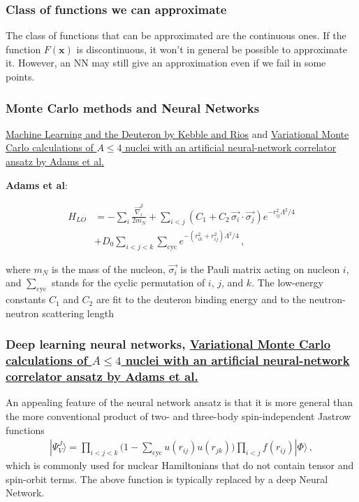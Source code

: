 \documentclass{beamer}
\begin{document}
\begin{frame}
\frametitle{Class of functions we can approximate}

\begin{block}{}
The class of functions that can be approximated are the continuous ones.
If the function $F(\bm{x})$ is discontinuous, it won't in general be possible to approximate it. However, an NN may still give an approximation even if we fail in some points.
\end{block}
\end{frame}

\begin{frame}
\frametitle{Monte Carlo methods and Neural Networks}

\href{{https://www.sciencedirect.com/science/article/pii/S0370269320305463?via%3Dihub}}{Machine Learning and the Deuteron by Kebble and Rios} and
\href{{https://journals.aps.org/prl/abstract/10.1103/PhysRevLett.127.022502}}{Variational Monte Carlo calculations of $A\le 4$ nuclei with an artificial neural-network correlator ansatz by Adams et al.}

\textbf{Adams et al}:

\begin{align}
H_{LO} &=-\sum_i \frac{{\vec{\nabla}_i^2}}{2m_N}
+\sum_{i<j} {\left(C_1  + C_2\, \vec{\sigma_i}\cdot\vec{\sigma_j}\right)
e^{-r_{ij}^2\Lambda^2 / 4 }}
\nonumber\\
&+D_0 \sum_{i<j<k} \sum_{\text{cyc}}
{e^{-\left(r_{ik}^2+r_{ij}^2\right)\Lambda^2/4}}\,,
\end{align}

where $m_N$ is the mass of the nucleon, $\vec{\sigma_i}$ is the Pauli
matrix acting on nucleon $i$, and $\sum_{\text{cyc}}$ stands for the
cyclic permutation of $i$, $j$, and $k$. The low-energy constants
$C_1$ and $C_2$ are fit to the deuteron binding energy and to the
neutron-neutron scattering length
\end{frame}

\begin{frame}
\frametitle{Deep learning neural networks, \href{{https://journals.aps.org/prl/abstract/10.1103/PhysRevLett.127.022502}}{Variational Monte Carlo calculations of $A\le 4$ nuclei with an artificial neural-network correlator ansatz by Adams et al.}}

An appealing feature of the neural network ansatz is that it is more general than the more conventional product of two-
and three-body spin-independent Jastrow functions
\begin{align}
|\Psi_V^J \rangle = \prod_{i<j<k} \Big( 1-\sum_{\text{cyc}} u(r_{ij}) u(r_{jk})\Big) \prod_{i<j} f(r_{ij}) | \Phi\rangle\,,
\end{align}
which is commonly used for nuclear Hamiltonians that do not contain tensor and spin-orbit terms.
The above function is typically replaced by a  deep Neural Network.
\end{frame}
\end{document}
